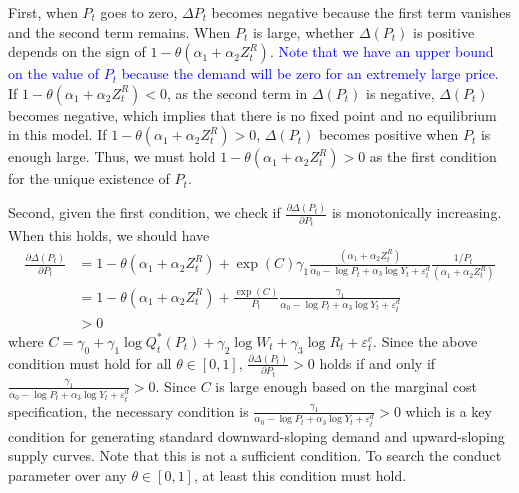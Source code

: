 \documentclass[11pt, a4paper]{article}
\begin{document}
First, when $P_t$ goes to zero, $\Delta P_t$ becomes negative because the first term vanishes and the second term remains.
When $P_t$ is large, whether $\Delta (P_t)$ is positive depends on the sign of $1 - \theta (\alpha_1 + \alpha_2 Z^{R}_{t})$. 
\textcolor{blue}{Note that we have an upper bound on the value of $P_t$ because the demand will be zero for an extremely large price.}
If $1 - \theta (\alpha_1 + \alpha_2 Z^{R}_{t})<0$, as the second term in $\Delta(P_t)$ is negative, $\Delta(P_t)$ becomes negative, which implies that there is no fixed point and no equilibrium in this model.
If $1 - \theta (\alpha_1 + \alpha_2 Z^{R}_{t})>0$, $\Delta(P_t)$ becomes positive when $P_{t}$ is enough large.
Thus, we must hold $1 - \theta (\alpha_1 + \alpha_2 Z^{R}_{t})>0$ as the first condition for the unique existence of $P_{t}$. 

Second, given the first condition, we check if $\frac{\partial\Delta(P_t)}{\partial P_t}$ is monotonically increasing.
When this holds, we should have
\begin{align*}
    \frac{\partial\Delta(P_t)}{\partial P_t}&=1 - \theta (\alpha_1 + \alpha_2 Z^{R}_{t}) + \exp(C)\gamma_1 \frac{(\alpha_1 + \alpha_2 Z^{R}_{t})}{\alpha_0 - \log P_{t} + \alpha_3 \log Y_t + \varepsilon^{d}_{t}} \frac{1/P_{t}}{(\alpha_1 + \alpha_2 Z^{R}_{t})}\\
    &=1 - \theta (\alpha_1 + \alpha_2 Z^{R}_{t}) + \frac{\exp(C)}{P_t} \frac{\gamma_1}{\alpha_0 - \log P_{t} + \alpha_3 \log Y_t + \varepsilon^{d}_{t}}\\
    & >0
\end{align*}
where $C=\gamma_0 + \gamma_1 \log Q_t^*(P_{t}) +  \gamma_2 \log W_{t} + \gamma_3 \log R_t + \varepsilon^{c}_{t}$. 
Since the above condition must hold for all $\theta\in[0,1]$, $\frac{\partial \Delta (P_t)}{\partial P_t} >0$ holds if and only if $\frac{\gamma_1}{\alpha_0 - \log P_{t} + \alpha_3 \log Y_t + \varepsilon^{d}_{t}}>0$. 
Since $C$ is large enough based on the marginal cost specification, the necessary condition is $\frac{\gamma_1}{\alpha_0 - \log P_{t} + \alpha_3 \log Y_t + \varepsilon^{d}_{t}}>0$ which is a key condition for generating standard downward-sloping demand and upward-sloping supply curves. Note that this is not a sufficient condition.
To search the conduct parameter over any $\theta\in [0,1]$, at least this condition must hold. 
\end{document}
